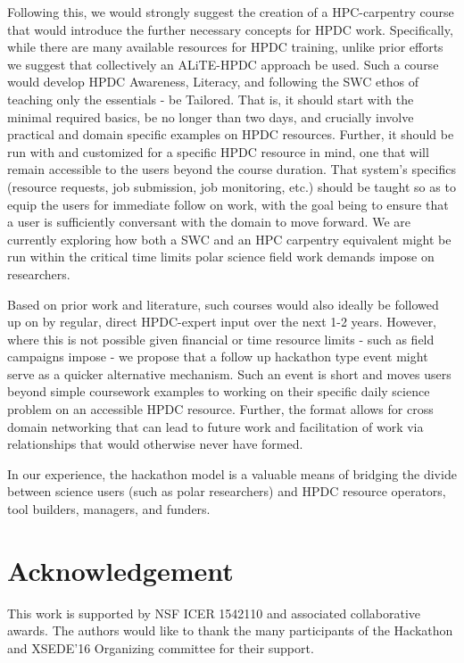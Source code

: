 \documentclass[conference]{IEEEtran}
\begin{document}
Following this, we would strongly suggest the creation of a HPC-carpentry course that would introduce the further necessary concepts for HPDC work. Specifically, while there are many available resources for HPDC training, unlike prior efforts we suggest that collectively an ALiTE-HPDC approach be used.  Such a course would develop HPDC Awareness, Literacy, and following the SWC ethos of teaching only the essentials - be Tailored. That is, it should start with the minimal required basics, be no longer than two days, and crucially involve practical and domain specific examples on HPDC resources. Further, it should be run with and customized for a specific HPDC resource in mind, one that will remain accessible to the users beyond the course duration. That system's specifics (resource requests, job submission, job monitoring, etc.) should be taught so as to equip the users for immediate follow on work, with the goal being to ensure that a user is sufficiently conversant with the domain to move forward. We are currently exploring how both a SWC and an HPC carpentry equivalent might be run within the critical time limits polar science field work demands impose on researchers.  

Based on prior work and literature, such courses would also ideally be followed up on by regular, direct HPDC-expert input over the next 1-2 years. However, where this is not possible given financial or time resource limits - such as field campaigns impose - we propose that a follow up hackathon type event might serve as a quicker alternative mechanism. Such an event is short and moves users beyond simple coursework examples to working on their specific daily science problem on an accessible HPDC resource. Further, the format allows for cross domain networking that can lead to future work and facilitation of work via relationships that would otherwise never have formed.

In our experience, the hackathon model is a valuable means of bridging the divide between science users (such as polar researchers) and HPDC resource operators, tool builders, managers, and funders.  



\section*{Acknowledgement}
This work is supported by NSF ICER 1542110 and associated collaborative
awards. The authors would like to thank the many participants of the Hackathon
and XSEDE'16 Organizing committee for their support.
\end{document}
